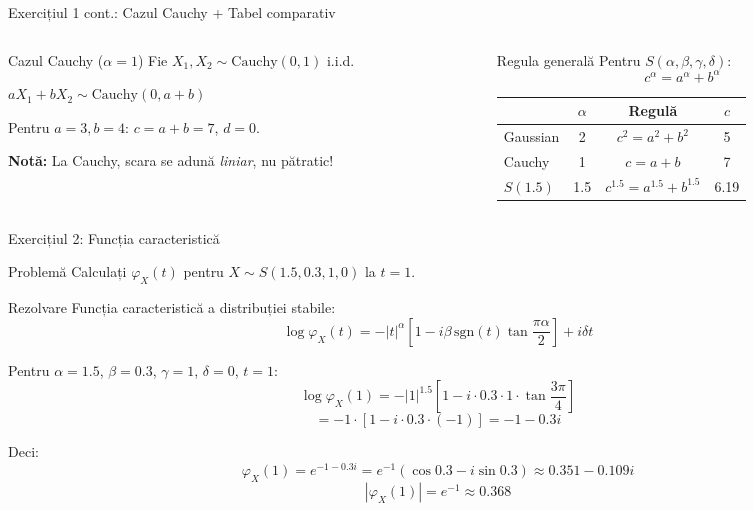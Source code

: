 \documentclass[9pt, aspectratio=169, t]{beamer}
\theoremstyle{definition}
\begin{document}
\begin{frame}{Exercițiul 1 cont.: Cazul Cauchy + Tabel comparativ}
\begin{columns}[T]
\begin{column}{0.48\textwidth}
\begin{block}{Cazul Cauchy ($\alpha = 1$)}
Fie $X_1, X_2 \sim \text{Cauchy}(0,1)$ i.i.d.

$aX_1 + bX_2 \sim \text{Cauchy}(0, a+b)$

Pentru $a=3, b=4$: $c = a + b = 7$, $d = 0$.

\vspace{0.2cm}
\textbf{Notă:} La Cauchy, scara se adună \textit{liniar}, nu pătratic!
\end{block}
\end{column}
\begin{column}{0.48\textwidth}
\begin{block}{Regula generală}
Pentru $S(\alpha, \beta, \gamma, \delta)$:
$$c^\alpha = a^\alpha + b^\alpha$$

\vspace{0.2cm}
\renewcommand{\arraystretch}{1.3}
\begin{tabular}{lccc}
\toprule
& $\alpha$ & Regulă & $c$ \\
\midrule
Gaussian & 2 & $c^2 = a^2+b^2$ & 5 \\
Cauchy & 1 & $c = a+b$ & 7 \\
$S(1.5)$ & 1.5 & $c^{1.5} = a^{1.5}+b^{1.5}$ & 6.19 \\
\bottomrule
\end{tabular}
\end{block}
\end{column}
\end{columns}
\end{frame}

\begin{frame}{Exercițiul 2: Funcția caracteristică}
\begin{block}{Problemă}
Calculați $\varphi_X(t)$ pentru $X \sim S(1.5, 0.3, 1, 0)$ la $t = 1$.
\end{block}

\begin{exampleblock}{Rezolvare}
Funcția caracteristică a distribuției stabile:
$$\log \varphi_X(t) = -|t|^\alpha \left[1 - i\beta\,\text{sgn}(t)\tan\frac{\pi\alpha}{2}\right] + i\delta t$$

Pentru $\alpha = 1.5$, $\beta = 0.3$, $\gamma = 1$, $\delta = 0$, $t = 1$:
$$\log \varphi_X(1) = -|1|^{1.5}\left[1 - i \cdot 0.3 \cdot 1 \cdot \tan\frac{3\pi}{4}\right]$$
$$= -1 \cdot [1 - i \cdot 0.3 \cdot (-1)] = -1 - 0.3i$$

Deci:
$$\varphi_X(1) = e^{-1 - 0.3i} = e^{-1}(\cos 0.3 - i\sin 0.3) \approx 0.351 - 0.109i$$
$$|\varphi_X(1)| = e^{-1} \approx 0.368$$
\end{exampleblock}
\end{frame}
\end{document}
